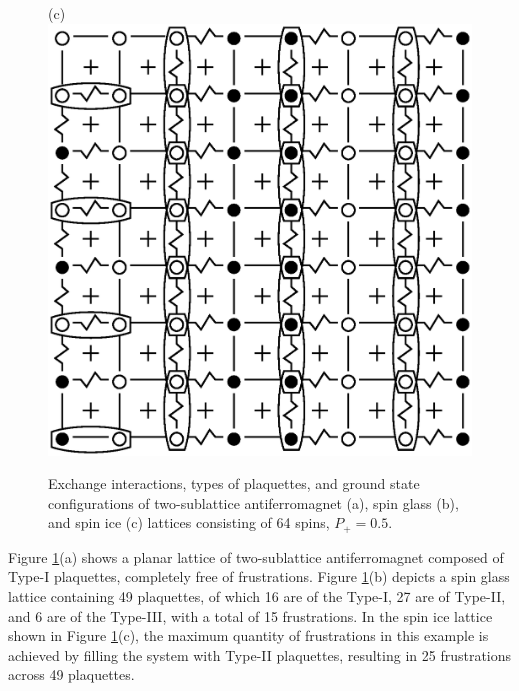 \documentclass[preprint,12pt]{elsarticle}
\begin{document}
\begin{figure}[H]
\begin{minipage}[h]{0.3\linewidth}
		\end{minipage}
		\hfill
		\begin{minipage}[h]{0.3\linewidth}
			\centering(c)
			\includegraphics[width=1\linewidth]{pictures/SI_64_J0}
		\end{minipage}
		\hfill
		\caption{Exchange interactions, types of plaquettes, and ground state configurations of two-sublattice antiferromagnet (a), spin glass (b), and spin ice (c) lattices consisting of 64 spins, $P_+ = 0.5$.}
		\label{fig:cell_SI_SG_64}
		
	\end{figure}
	
	
	Figure \ref{fig:cell_SI_SG_64}(a) shows a planar lattice of two-sublattice antiferromagnet composed of Type-I plaquettes, completely free of frustrations.
	Figure \ref{fig:cell_SI_SG_64}(b) depicts a spin glass lattice containing 49 plaquettes, of which 16 are of the Type-I, 27 are of Type-II, and 6 are of the Type-III, with a total of 15 frustrations.
	In the spin ice lattice shown in Figure \ref{fig:cell_SI_SG_64}(c), the maximum quantity of frustrations in this example is achieved by filling the system with Type-II plaquettes, resulting in 25 frustrations across 49 plaquettes.
	
\end{document}
